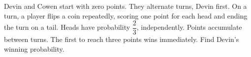 Devin and Cowen start with zero points. They alternate turns, Devin first. On a turn, a player flips a coin repeatedly, scoring one point for each head and ending the turn on a tail. Heads have probability $\dfrac{2}{3}$, independently. Points accumulate between turns. The first to reach three points wins immediately. Find Devin's winning probability.
